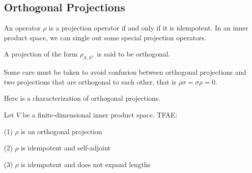 \subsection{Orthogonal Projections}
An operator $\rho$ is a projection operator if and only if it is idempotent. In an inner product space, we can single out some special projection operators.
\begin{definition}
A projection of the form $\rho_{S,S^\perp}$ is said to be orthogonal.
\end{definition}
\begin{remark}
Some care must be taken to avoid confusion between orthogonal projections and two projections that are orthogonal to each other, that is $\rho\sigma=\sigma\rho=0$.
\end{remark}
Here is a characterization of orthogonal projections.
\begin{theorem}
Let $V$ be a finite-dimensional inner product space. TFAE:\par
(1) $\rho$ is an orthogonal projection\par
(2) $\rho$ is idempotent and self-adjoint\par
(3) $\rho$ is idempotent and does not expand lengths
\end{theorem}


